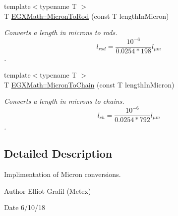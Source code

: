 \begin{DoxyCompactItemize}
{\footnotesize template$<$typename T $>$ }\\T \mbox{\hyperlink{group___e_g_x_math-_conversions-_length_conversions-_non-_s_i-_micron-_surveyors_gae81e23a6186148740d3b610089ba3c2e}{E\+G\+X\+Math\+::\+Micron\+To\+Rod}} (const T length\+In\+Micron)
\begin{DoxyCompactList}\small\item\em Converts a length in microns to rods. \[ l_{rod}= \frac{10^{-6}}{0.0254 * 198} l_{\mu m} \]. \end{DoxyCompactList}\item 
{\footnotesize template$<$typename T $>$ }\\T \mbox{\hyperlink{group___e_g_x_math-_conversions-_length_conversions-_non-_s_i-_micron-_surveyors_ga35d9a4c6d414802981ea103491e458bd}{E\+G\+X\+Math\+::\+Micron\+To\+Chain}} (const T length\+In\+Micron)
\begin{DoxyCompactList}\small\item\em Converts a length in microns to chains. \[ l_{ch}= \frac{10^{-6}}{0.0254 * 792} l_{\mu m} \]. \end{DoxyCompactList}\end{DoxyCompactItemize}


\subsection{Detailed Description}
Implimentation of Micron conversions. 

\begin{DoxyAuthor}{Author}
Elliot Grafil (Metex) 
\end{DoxyAuthor}
\begin{DoxyDate}{Date}
6/10/18 
\end{DoxyDate}
